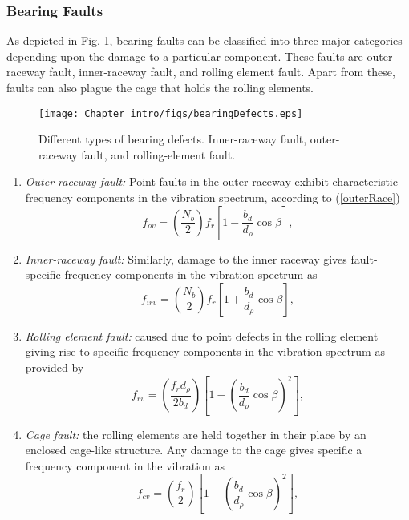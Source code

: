 \subsubsection{Bearing Faults}
As depicted in Fig. \ref{Fig:bearingDefects}, bearing faults can be classified into three major categories depending upon the damage to a particular component. These faults are outer-raceway fault, inner-raceway fault, and rolling element fault. Apart from these, faults can also plague the cage that holds the rolling elements. 
\begin{figure}[h] \centering
	{\texttt{[image: Chapter\_intro/figs/bearingDefects.eps]}} \caption{Different types of bearing defects. Inner-raceway fault, outer-raceway fault, and rolling-element fault.} \label{Fig:bearingDefects}
\end{figure}
%
\begin{enumerate}
	\renewcommand{\theenumi}{\roman{enumi}}
	\item \emph{Outer-raceway fault:} Point faults in the outer raceway exhibit characteristic frequency components in the vibration spectrum, according to (\ref{outerRace})
	\begin{equation}
		\label{outerRace} {f_{ov}} = \left( {\frac{N_b}{2}}	\right){f_r}\left[ {1 - \frac{{{b_d}}}{{{d_\rho }}}\cos \beta }
		\right],
	\end{equation}

	\item \emph{Inner-raceway fault:} Similarly, damage to the inner raceway gives fault-specific frequency components in the vibration spectrum as
	\begin{equation}
		\label{innerRace} {f_{irv}} = \left( {\frac{N_b}{2}} \right){f_r}\left[ {1 + \frac{{{b_d}}}{{{d_\rho }}}\cos \beta }
		\right],
	\end{equation}
	\item \emph{Rolling element fault:} caused due to point defects in the rolling element giving rise to specific frequency components in the vibration spectrum as provided by
	\begin{equation}
		\label{ball}{f_{rv}} = \left( {\frac{{{f_r}{d_\rho }}}{{2{b_d}}}} \right)\left[ {1 - {{\left( {\frac{{{b_d}}}{{{d_\rho }}}\cos \beta
					} \right)}^2}} \right],
	\end{equation}
	\item \emph{Cage fault:} the rolling elements are held together in their place by an enclosed cage-like structure. Any damage to the cage gives specific a frequency component in the vibration as  
	\begin{equation}
		\label{cage} 
		{f_{cv}} = \left( {\frac{{{f_r}}}{2}} \right)\left[ {1 - {{\left( {\frac{{{b_d}}}{{{d_\rho }}}\cos \beta } \right)}^2}} \right],
	\end{equation}
\end{enumerate} 
